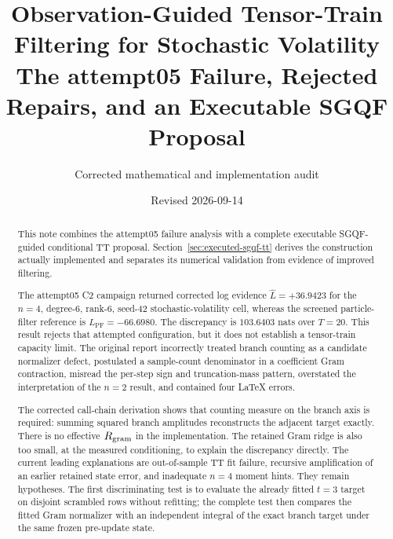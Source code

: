 \documentclass[11pt]{article}
\title{Observation-Guided Tensor-Train Filtering for Stochastic Volatility\\
\large The attempt05 Failure, Rejected Repairs, and an Executable SGQF Proposal}
\author{Corrected mathematical and implementation audit}
\date{Revised 2026-09-14}
\begin{document}
\maketitle

\begin{abstract}
This note combines the attempt05 failure analysis with a complete executable
SGQF-guided conditional TT proposal. Section~\ref{sec:executed-sgqf-tt}
derives the construction actually implemented and separates its numerical
validation from evidence of improved filtering.

The attempt05 C2 campaign returned corrected log evidence
$\widehat L=+36.9423$ for the $n=4$, degree-6, rank-6, seed-42
stochastic-volatility cell, whereas the screened particle-filter reference is
$L_{\mathrm{PF}}=-66.6980$. The discrepancy is $103.6403$ nats over $T=20$.
This result rejects that attempted configuration, but it does not establish a
tensor-train capacity limit. The original report incorrectly treated branch
counting as a candidate normalizer defect, postulated a sample-count
denominator in a coefficient Gram contraction, misread the per-step sign and
truncation-mass pattern, overstated the interpretation of the $n=2$ result,
and contained four LaTeX errors.

The corrected call-chain derivation shows that counting measure on the branch
axis is required: summing squared branch amplitudes reconstructs the adjacent
target exactly. There is no effective $R_{\rm gram}$ in the implementation.
The retained Gram ridge is also too small, at the measured conditioning, to
explain the discrepancy directly. The current leading explanations are
out-of-sample TT fit failure, recursive amplification of an earlier retained
state error, and inadequate $n=4$ moment hints. They remain hypotheses. The
first discriminating test is to evaluate the already fitted $t=3$ target on
disjoint scrambled rows without refitting; the complete test then compares the
fitted Gram normalizer with an independent integral of the exact branch target
under the same frozen pre-update state.


\end{abstract}
\end{document}
